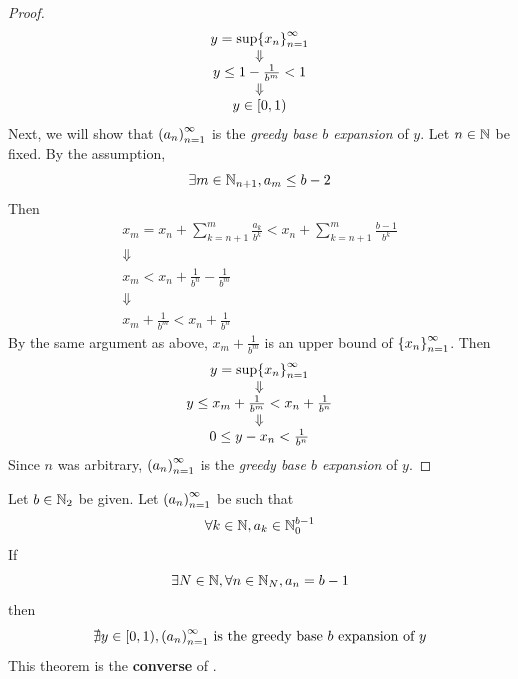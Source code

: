 \begin{proof}
    \[
    \begin{array}{c}
        y = \sup \set*{x_{n}}_{n = 1}^{\infty} \\
        \Downarrow \\
        y \leq 1 - \frac{1}{b^{m}} < 1 \\
        \Downarrow \\
        y \in [0, 1)
    \end{array}
    \]
    Next, we will show that $\paren*{a_{n}}_{n = 1}^{\infty}$ is the \emph{greedy base $b$ expansion} of $y$.
    Let $n \in \N$ be fixed. By the assumption,
    \[
    \exists m \in \N_{n + 1}, a_{m} \leq b - 2
    \]
    Then
    \[
    \begin{array}{c}
        x_{m} = x_{n} + \sum_{k = n + 1}^{m} \frac{a_{k}}{b^{k}} < x_{n} + \sum_{k = n + 1}^{m} \frac{b - 1}{b^{k}} \\
        \Downarrow \\
        x_{m} < x_{n} + \frac{1}{b^{n}} - \frac{1}{b^{m}} \\
        \Downarrow \\
        x_{m} + \frac{1}{b^{m}} < x_{n} + \frac{1}{b^{n}}
    \end{array}
    \]
    By the same argument as above, $x_{m} + \frac{1}{b^{m}}$ is an upper bound of $\set*{x_{n}}_{n = 1}^{\infty}$. Then
    \[
    \begin{array}{c}
        y = \sup \set*{x_{n}}_{n = 1}^{\infty} \\
        \Downarrow \\
        y \leq x_{m} + \frac{1}{b^{m}} < x_{n} + \frac{1}{b^{n}} \\
        \Downarrow \\
        0 \leq y - x_{n} < \frac{1}{b^{n}}
    \end{array}
    \]
    Since $n$ was arbitrary, $\paren*{a_{n}}_{n = 1}^{\infty}$ is the \emph{greedy base $b$ expansion} of $y$.
\end{proof}

\bigskip

\begin{theorem} \label{an:thm:no-real-number-matching-greedy-base-expansion-converse}
    Let $b \in \N_{2}$ be given. Let $\paren*{a_{n}}_{n = 1}^{\infty}$ be such that
    \[
    \forall k \in \N, a_{k} \in \N_{0}^{b - 1}
    \]
    If
    \[
    \exists N \in \N, \forall n \in \N_{N}, a_{n} = b - 1
    \]
    then
    \[
    \nexists y \in [0, 1), \paren*{a_{n}}_{n = 1}^{\infty} \text{ is the greedy base $b$ expansion of $y$}
    \]
    This theorem is the \textbf{converse} of .
\end{theorem}

